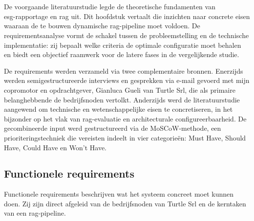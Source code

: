 \chapter{}%
\label{ch:requirementsanalyse}

De voorgaande literatuurstudie legde de theoretische fundamenten van\\\gls{esg}-rapportage en \gls{rag} uit. Dit hoofdstuk vertaalt die inzichten naar concrete eisen waaraan de te bouwen dynamische \gls{rag}-pipeline moet voldoen. De requirementsanalyse vormt de schakel tussen de probleemstelling en de technische implementatie: zij bepaalt welke criteria de optimale configuratie moet behalen en biedt een objectief raamwerk voor de latere fases in de vergelijkende studie.

De requirements werden verzameld via twee complementaire bronnen. Enerzijds werden semigestructureerde interviews en gesprekken via e-mail gevoerd met mijn copromotor en opdrachtgever, Gianluca Gueli van Turtle Srl, die als primaire belanghebbende de bedrijfsnoden vertolkt. Anderzijds werd de literatuurstudie aangewend om technische en wetenschappelijke eisen te concretiseren, in het bijzonder op het vlak van \gls{rag}-evaluatie \autocite{Es2024} en architecturale configureerbaarheid. De gecombineerde input werd gestructureerd via de MoSCoW-methode, een prioriteringstechniek die vereisten indeelt in vier categorieën: Must Have, Should Have, Could Have en Won't Have.

\section{Functionele requirements}

Functionele requirements beschrijven wat het systeem concreet moet kunnen doen. Zij zijn direct afgeleid van de bedrijfsnoden van Turtle Srl en de kerntaken van een \gls{rag}-pipeline.

